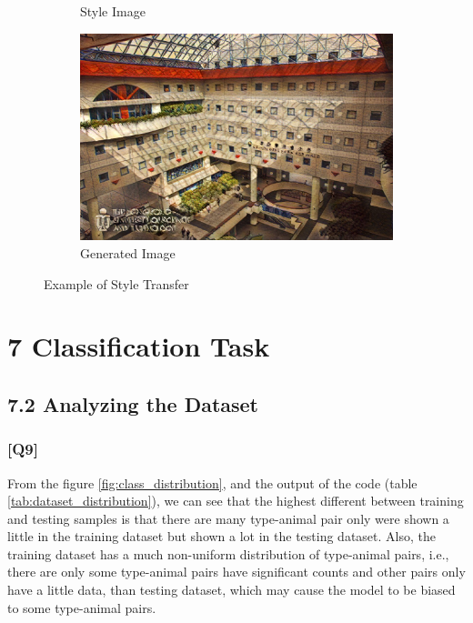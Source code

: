 \documentclass{article}
\begin{document}
\begin{figure}[h!]
\begin{minipage}{\textwidth}
\begin{subfigure}{0.25\textwidth}
            \caption{Style Image}
        \end{subfigure}
        \hfill %
        \begin{subfigure}{0.25\textwidth}
            \includegraphics[width=\textwidth]{./part1_inference/output_14_sandro-botticelli_crucifixion(1).jpg}
            \caption{Generated Image}
        \end{subfigure}
    \end{minipage}    
    
    \caption{Example of Style Transfer}
    \label{fig:part1_inference}
\end{figure}

\newpage

\section*{7 Classification Task}

\subsection*{7.2 Analyzing the Dataset}

\subsubsection*{[Q9]}

From the figure \ref{fig:class_distribution}, and the output of the code (table \ref{tab:dataset_distribution}), 
we can see that the highest different between training and testing samples is that there are many type-animal pair only were shown a little in the training dataset but shown a lot in the testing dataset.
Also, the training dataset has a much non-uniform distribution of type-animal pairs, i.e., there are only some type-animal pairs have significant counts and other pairs only have a little data, than testing dataset, which may cause the model to be biased to some type-animal pairs.
\end{document}
